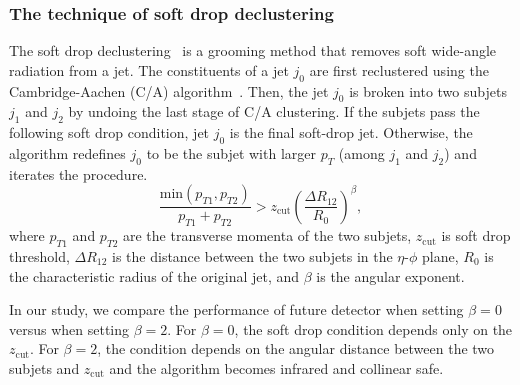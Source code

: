 \documentclass[12pt,twoside,a4paper,an,final]{cms-tdr}
\begin{document}
\subsubsection{The technique of soft drop declustering}
The soft drop declustering~\cite{Larkoski:2014wba} is a grooming method 
that removes soft wide-angle radiation from a jet. The constituents of a jet 
$j_0$ are first reclustered using the Cambridge-Aachen
 (C/A) algorithm~\cite{Dokshitzer:1997in,Wobisch:1998wt}. Then, the jet $j_0$ 
is broken into two subjets $j_1$ and $j_2$ by undoing the last stage of C/A 
clustering.
If the subjets pass the following soft drop condition, jet $j_0$ is the final 
soft-drop jet. Otherwise, the algorithm redefines $j_0$ to be the subjet with 
larger $p_T$ (among $j_1$ and $j_2$) and iterates the procedure.
\begin{equation} \label{eq:soft-drop}
\frac{\mathrm{min}(p_{T1},p_{T2})}{p_{T1}+p_{T2}}>z_\mathrm{cut}(\frac{\Delta R_{12}}{R_{0}})^{\beta},
\end{equation}
where $p_{T1}$ and $p_{T2}$ are the transverse momenta of the two subjets, 
$z_\mathrm{cut}$ is soft drop threshold, 
$\Delta R_{12}$ is the distance between the two subjets in the $\eta$-$\phi$ 
plane, $R_0$ is the characteristic radius of the original jet, and $\beta$ is 
the angular exponent.

In our study, we compare the performance of future detector when setting 
$\beta=0$ versus when setting $\beta=2$. For $\beta=0$, the soft drop condition 
depends only on the $z_\mathrm{cut}$. For $\beta=2$, the condition depends on 
the angular distance between the two subjets and $z_\mathrm{cut}$ and the 
algorithm becomes infrared and collinear safe. 
\end{document}
